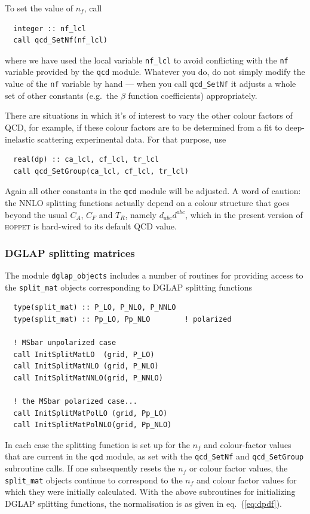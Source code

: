 \documentclass[12pt]{article}
\newcommand{\eg}{e.g.\ }
\newcommand{\hoppet}{\textsc{hoppet}\xspace}
\newcommand{\ttt}[1]{\texttt{#1}}
\begin{document}
To set the value of $n_f$, call
\begin{lstlisting}
  integer :: nf_lcl
  call qcd_SetNf(nf_lcl)  
\end{lstlisting}
where we have used the local 
variable \ttt{nf\_lcl} to avoid conflicting with
the \ttt{nf} variable provided by the \ttt{qcd} module. Whatever you
do, do not simply modify the value of the \ttt{nf} variable by hand
--- when you call \ttt{qcd\_SetNf} it adjusts a whole set of other
constants (\eg the $\beta$ function coefficients) appropriately.

There are situations in which it's of interest to vary the other
colour factors of QCD, for example, if these
colour factors are to be determined from a fit
to deep-inelastic scattering experimental data. For that purpose, use
\begin{lstlisting}
  real(dp) :: ca_lcl, cf_lcl, tr_lcl
  call qcd_SetGroup(ca_lcl, cf_lcl, tr_lcl)
\end{lstlisting}
Again all other constants in the \ttt{qcd} module will be adjusted. A
word of caution: the NNLO splitting functions actually depend on a
colour structure that goes beyond the usual $C_A$, $C_F$ and $T_R$,
namely $d_{abc}d^{abc}$, which in the present version of \hoppet
is hard-wired to its default QCD value.




\subsubsection{DGLAP splitting matrices}
\label{sec:dglap-split}

The module \ttt{dglap\_objects} includes a number of routines for
providing access to the \ttt{split\_mat} objects corresponding to
DGLAP splitting functions
\begin{lstlisting}
  type(split_mat) :: P_LO, P_NLO, P_NNLO
  type(split_mat) :: Pp_LO, Pp_NLO        ! polarized

  ! MSbar unpolarized case
  call InitSplitMatLO  (grid, P_LO)
  call InitSplitMatNLO (grid, P_NLO)
  call InitSplitMatNNLO(grid, P_NNLO)

  ! the MSbar polarized case...
  call InitSplitMatPolLO (grid, Pp_LO)
  call InitSplitMatPolNLO(grid, Pp_NLO)
\end{lstlisting}
In each case the splitting function is set up for the $n_f$ and
colour-factor values that are current in the $\ttt{qcd}$ module, as
set with the \ttt{qcd\_SetNf} and \ttt{qcd\_SetGroup} subroutine calls. If one
subsequently resets the $n_f$ or colour factor values, the \ttt{split\_mat}
objects continue to correspond to the $n_f$ and colour factor values
for which they were initially calculated.
With the above subroutines for initializing DGLAP splitting functions,
the normalisation is as given in eq.~(\ref{eq:dpdf}).
\end{document}
